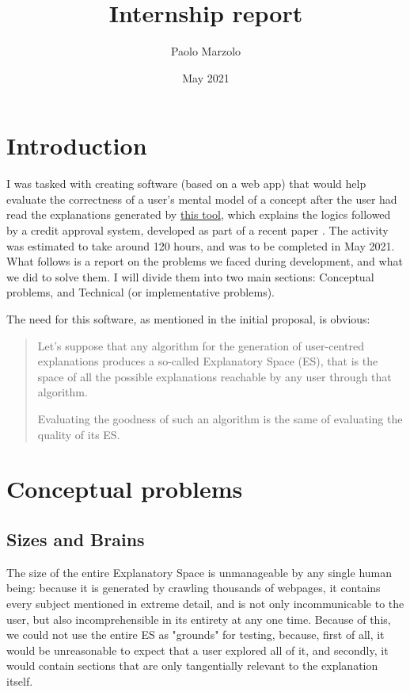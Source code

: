 \documentclass{article}
\title{Internship report}
\author{Paolo Marzolo}
\date{May 2021}
\begin{document}
\maketitle

\section{Introduction}
I was tasked with creating software (based on a web app) that would help evaluate the correctness of a user's mental model of a concept after the user had read the explanations generated by \href{https://github.com/Francesco-Sovrano/From-Philosophy-to-Interfaces-an-Explanatory-Method-and-a-Tool-Inspired-by-Achinstein-s-Theory-of-E}{this tool}, which explains the logics followed by a credit approval system, developed as part of a recent paper \cite{sovrano2021philosophy}. The activity was estimated to take around 120 hours, and was to be completed in May 2021. What follows is a report on the problems we faced during development, and what we did to solve them. I will divide them into two main sections: Conceptual problems, and Technical (or implementative problems).

The need for this software, as mentioned in the initial proposal, is obvious: 
\begin{quote}
    Let’s suppose that any algorithm for the generation of user-centred explanations produces a so-called Explanatory Space (ES), that is the space of all the possible explanations reachable by any user through that algorithm.

    Evaluating the goodness of such an algorithm is the same of evaluating the quality of its ES.
\end{quote}

\section{Conceptual problems}
\subsection{Sizes and Brains}
The size of the entire Explanatory Space is unmanageable by any single human being: because it is generated by crawling thousands of webpages, it contains every subject mentioned in extreme detail, and is not only incommunicable to the user, but also incomprehensible in its entirety at any one time. Because of this, we could not use the entire ES as "grounds" for testing, because, first of all, it would be unreasonable to expect that a user explored all of it, and secondly, it would contain sections that are only tangentially relevant to the explanation itself. 
\end{document}
